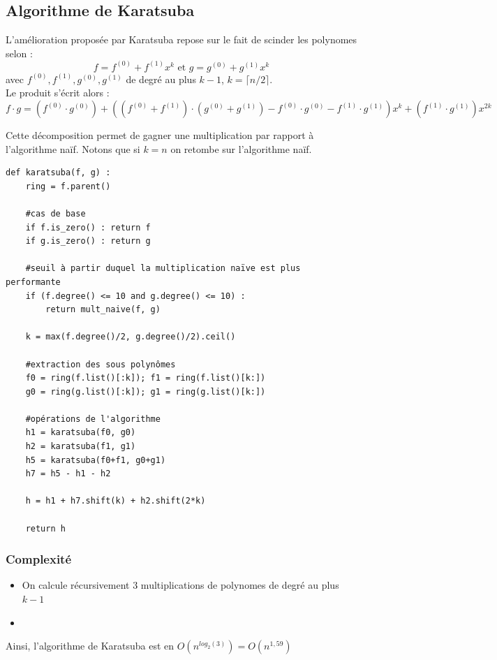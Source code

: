 \documentclass[a4paper]{article}
\begin{document}
\subsection{Algorithme de Karatsuba}

L'amélioration proposée par Karatsuba repose sur le fait de scinder les polynomes selon :
\[
f=f^{(0)}+f^{(1)}x^k\text{ et }g = g^{(0)}+g^{(1)}x^k
\]
avec $f^{(0)}, f^{(1)}, g^{(0)}, g^{(1)}$ de degré au plus $k-1$, $k=\lceil n/2 \rceil$. \\
Le produit s'écrit alors :
\[
  f\cdot g = (f^{(0)}\cdot g^{(0)})
  +\left((f^{(0)}+f^{(1)})\cdot (g^{(0)} + g^{(1)}) - f^{(0)}\cdot g^{(0)} - f^{(1)}\cdot g^{(1)}\right)x^k+
  (f^{(1)}\cdot g^{(1)})x^{2k} 
\]

Cette décomposition permet de gagner une multiplication par rapport à l'algorithme naïf. Notons que si $k=n$ on retombe sur l'algorithme naïf.

\begin{lstlisting}[title={Karatsuba}]
def karatsuba(f, g) :
    ring = f.parent()

    #cas de base
    if f.is_zero() : return f
    if g.is_zero() : return g
    
    #seuil à partir duquel la multiplication naïve est plus performante
    if (f.degree() <= 10 and g.degree() <= 10) : 
        return mult_naive(f, g)

    k = max(f.degree()/2, g.degree()/2).ceil()

    #extraction des sous polynômes
    f0 = ring(f.list()[:k]); f1 = ring(f.list()[k:])
    g0 = ring(g.list()[:k]); g1 = ring(g.list()[k:])

    #opérations de l'algorithme
    h1 = karatsuba(f0, g0)
    h2 = karatsuba(f1, g1)
    h5 = karatsuba(f0+f1, g0+g1)
    h7 = h5 - h1 - h2

    h = h1 + h7.shift(k) + h2.shift(2*k)

    return h
\end{lstlisting}

\subsubsection*{Complexité}
\begin{itemize}
    \item On calcule récursivement 3 multiplications de polynomes de degré au plus $k-1$
    \item 
\end{itemize}
Ainsi, l'algorithme de Karatsuba est en $O(n^{log_2(3)}) = O(n^{1,59})$
\end{document}
